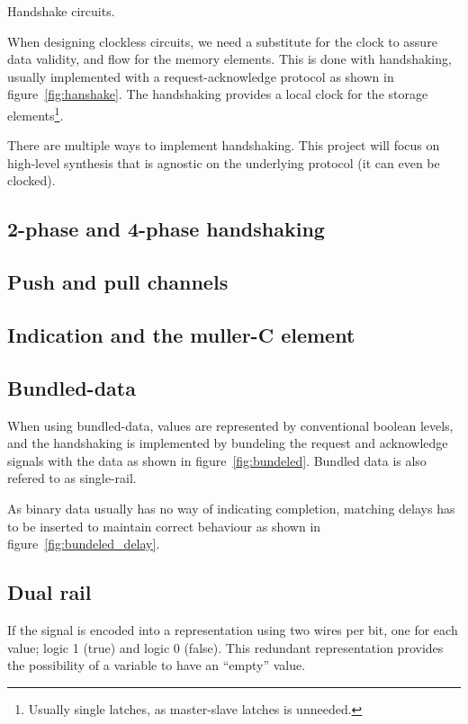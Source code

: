 Handshake circuits.

When designing clockless circuits, we need a substitute for the clock
to assure data validity, and flow for the memory elements. This is
done with handshaking, usually implemented with a request-acknowledge
protocol as shown in figure~\ref{fig:hanshake}. The handshaking
provides a local clock for the storage elements\footnote{Usually
  single latches, as master-slave latches is unneeded.}.

There are multiple ways to implement handshaking. This project will
focus on high-level synthesis that is agnostic on the underlying
protocol (it can even be clocked). 

\subsection{2-phase and 4-phase handshaking}


\subsection{Push and pull channels}

\subsection{Indication and the muller-C element}

\subsection{Bundled-data}

When using bundled-data, values are represented by conventional
boolean levels, and the handshaking is implemented by bundeling the
request and acknowledge signals with the data as shown in
figure~\ref{fig:bundeled}. Bundled data is also refered to as
single-rail.

As binary data usually has no way of indicating completion, matching
delays has to be inserted to maintain correct behaviour as shown in
figure~\ref{fig:bundeled_delay}.

\subsection{Dual rail}

If the signal is encoded into a representation using two wires per
bit, one for each value; logic 1 (true) and logic 0 (false). This
redundant representation provides the possibility of a variable to
have an ``empty'' value. 

